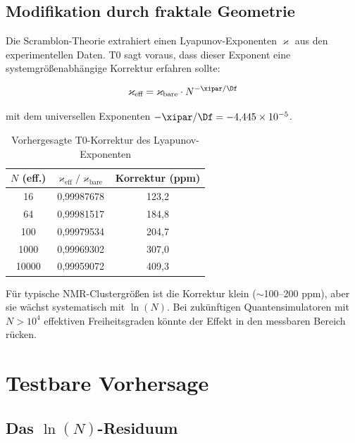 \subsection{Modifikation durch fraktale Geometrie}

Die Scramblon-Theorie extrahiert einen Lyapunov-Exponenten $\varkappa$ aus den experimentellen Daten. T0 sagt voraus, dass dieser Exponent eine systemgrößenabhängige Korrektur erfahren sollte:

\begin{equation}
	\varkappa_{\text{eff}} = \varkappa_{\text{bare}} \cdot N^{-\xipar/\Df}
	\label{eq:lyapunov_correction}
\end{equation}

mit dem universellen Exponenten $-\xipar/\Df = -4{,}445 \times 10^{-5}$.

\begin{table}[h]
	\centering
	\caption{Vorhergesagte T0-Korrektur des Lyapunov-Exponenten}
	\label{tab:lyapunov}
	\begin{tabular}{@{}ccc@{}}
		\toprule
		$N$ (eff.) & $\varkappa_{\text{eff}} / \varkappa_{\text{bare}}$ & Korrektur (ppm) \\
		\midrule
		16 & 0,99987678 & 123,2 \\
		64 & 0,99981517 & 184,8 \\
		100 & 0,99979534 & 204,7 \\
		1000 & 0,99969302 & 307,0 \\
		10000 & 0,99959072 & 409,3 \\
		\bottomrule
	\end{tabular}
\end{table}

\begin{remark}
	Für typische NMR-Clustergrößen ist die Korrektur klein ($\sim$100--200 ppm), aber sie wächst systematisch mit $\ln(N)$. Bei zukünftigen Quantensimulatoren mit $N > 10^4$ effektiven Freiheitsgraden könnte der Effekt in den messbaren Bereich rücken.
\end{remark}


\section{Testbare Vorhersage}
\label{sec:prediction}

\subsection{Das $\ln(N)$-Residuum}

